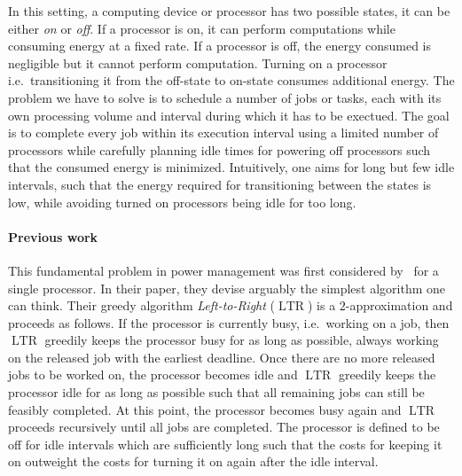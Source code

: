 \documentclass[a4paper]{article}
\DeclareMathOperator{\ltr}{LTR}
\begin{document}
In this setting, a computing device or processor has two possible states, it can be either \emph{on} or \emph{off}.
If a processor is on, it can perform computations while consuming energy at a fixed rate.
If a processor is off, the energy consumed is negligible but it cannot perform computation.
Turning on a processor i.e.\ transitioning it from the off-state to on-state consumes additional energy.
The problem we have to solve is to schedule a number of jobs or tasks, each with its own processing volume and interval during which it has to be exectued.
The goal is to complete every job within its execution interval using a limited number of processors while carefully planning idle times for powering off processors such that the consumed energy is minimized.
Intuitively, one aims for long but few idle intervals, such that the energy required for transitioning between the states is low, while avoiding turned on processors being idle for too long.

\paragraph{Previous work}
This fundamental problem in power management was first considered by~\cite{irani_left_to_right_soda_2003} for a single processor.
In their paper, they devise arguably the simplest algorithm one can think.
Their greedy algorithm \emph{Left-to-Right} ($\ltr$) is a $2$-approximation and proceeds as follows.
If the processor is currently busy, i.e.\ working on a job, then $\ltr$ greedily keeps the processor busy for as long as possible, always working on the released job with the earliest deadline.
Once there are no more released jobs to be worked on, the processor becomes idle and $\ltr$ greedily keeps the processor idle for as long as possible such that all remaining jobs can still be feasibly completed.
At this point, the processor becomes busy again and $\ltr$ proceeds recursively until all jobs are completed.
The processor is defined to be off for idle intervals which are sufficiently long such that the costs for keeping it on outweight the costs for turning it on again after the idle interval.
\end{document}
